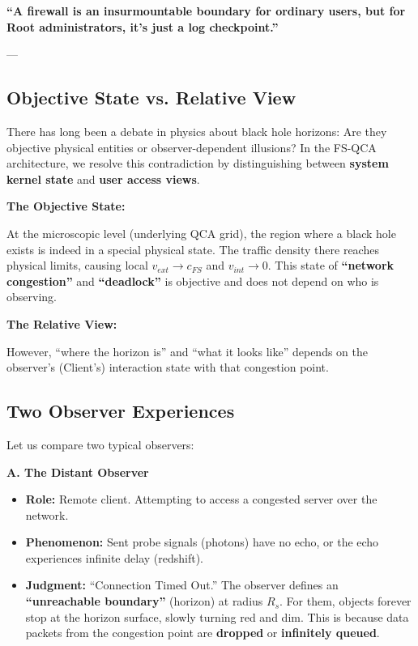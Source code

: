 \documentclass[11pt,a4paper,twoside]{book}
\begin{document}
\textbf{``A firewall is an insurmountable boundary for ordinary users, but for Root administrators, it's just a log checkpoint.''}

---

\subsection{Objective State vs. Relative View}

There has long been a debate in physics about black hole horizons: Are they objective physical entities or observer-dependent illusions? In the FS-QCA architecture, we resolve this contradiction by distinguishing between \textbf{system kernel state} and \textbf{user access views}.

\textbf{The Objective State:}

At the microscopic level (underlying QCA grid), the region where a black hole exists is indeed in a special physical state. The traffic density there reaches physical limits, causing local \textbf{$v_{ext} \to c_{FS}$} and \textbf{$v_{int} \to 0$}. This state of \textbf{``network congestion''} and \textbf{``deadlock''} is objective and does not depend on who is observing.

\textbf{The Relative View:}

However, ``where the horizon is'' and ``what it looks like'' depends on the observer's (Client's) interaction state with that congestion point.

\subsection{Two Observer Experiences}

Let us compare two typical observers:

\textbf{A. The Distant Observer}

\begin{itemize}
\item \textbf{Role:} Remote client. Attempting to access a congested server over the network.

\item \textbf{Phenomenon:} Sent probe signals (photons) have no echo, or the echo experiences infinite delay (redshift).

\item \textbf{Judgment:} ``Connection Timed Out.'' The observer defines an \textbf{``unreachable boundary''} (horizon) at radius \textbf{$R_s$}. For them, objects forever stop at the horizon surface, slowly turning red and dim. This is because data packets from the congestion point are \textbf{dropped} or \textbf{infinitely queued}.
\end{itemize}
\end{document}
